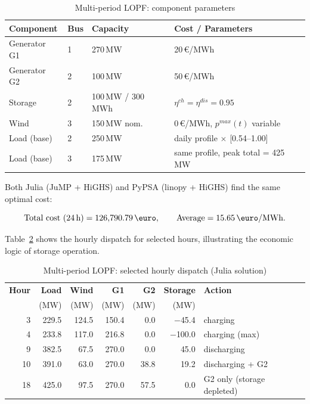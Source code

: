 \begin{table}[H]
\centering
\caption{Multi-period LOPF: component parameters}
\label{tab:mp_params}
\begin{tabular}{llll}
\toprule
\textbf{Component} & \textbf{Bus} & \textbf{Capacity} & \textbf{Cost / Parameters} \\
\midrule
Generator G1   & 1 & 270\,MW        & 20\,\euro/MWh \\
Generator G2   & 2 & 100\,MW        & 50\,\euro/MWh \\
Storage        & 2 & 100\,MW / 300\,MWh & $\eta^{ch} = \eta^{dis} = 0.95$ \\
Wind           & 3 & 150\,MW nom.   & 0\,\euro/MWh, $p^{max}(t)$ variable \\
Load (base)    & 2 & 250\,MW        & daily profile $\times$ [0.54--1.00] \\
Load (base)    & 3 & 175\,MW        & same profile, peak total = 425\,MW \\
\bottomrule
\end{tabular}
\end{table}

Both Julia (JuMP + HiGHS) and PyPSA (linopy + HiGHS) find the same optimal cost:

\begin{equation}
    \text{Total cost (24\,h)} = 126{,}790.79\,\text{\euro},
    \qquad
    \text{Average} = 15.65\,\text{\euro/MWh}.
    \label{eq:mp_cost}
\end{equation}

Table~\ref{tab:mp_dispatch} shows the hourly dispatch for selected hours, illustrating the economic logic of storage operation.

\begin{table}[H]
\centering
\caption{Multi-period LOPF: selected hourly dispatch (Julia solution)}
\label{tab:mp_dispatch}
\begin{tabular}{rrrrrrl}
\toprule
\textbf{Hour} & \textbf{Load} & \textbf{Wind} & \textbf{G1} & \textbf{G2} & \textbf{Storage} & \textbf{Action} \\
& (MW) & (MW) & (MW) & (MW) & (MW) & \\
\midrule
 3 &  229.5 & 124.5 & 150.4 &  0.0 & $-$45.4 & charging \\
 4 &  233.8 & 117.0 & 216.8 &  0.0 & $-$100.0 & charging (max) \\
 9 &  382.5 &  67.5 & 270.0 &  0.0 &  45.0 & discharging \\
10 &  391.0 &  63.0 & 270.0 & 38.8 &  19.2 & discharging + G2 \\
18 &  425.0 &  97.5 & 270.0 & 57.5 &   0.0 & G2 only (storage depleted) \\
\bottomrule
\end{tabular}
\end{table}

